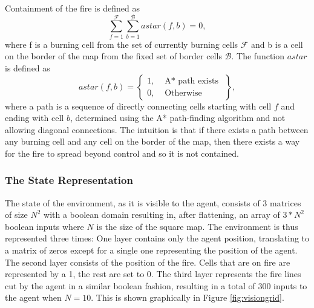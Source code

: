 Containment of the fire is defined as
\begin{equation}\label{eq:containment}
    \sum_{f=1}^\mathcal{F} \sum_{b=1}^\mathcal{B} astar(f, b) = 0,
\end{equation}
where f is a burning cell from the set of currently burning cells $\mathcal{F}$ and b is a cell on the border of the map from the fixed set of border cells $\mathcal{B}$. The function $astar$ is defined as
\begin{equation}\label{eq:astar}
    astar(f, b) = \left\{
        \begin{array}{lr}
            1, & \text{ A* path exists }\\
            0, & \text{ Otherwise }
        \end{array}\right\},
\end{equation}
where a path is a sequence of directly connecting cells starting with cell $f$ and ending with cell $b$, determined using the A* path-finding algorithm and not allowing diagonal connections. The intuition is that if there exists a path between any burning cell and any cell on the border of the map, then there exists a way for the fire to spread beyond control and so it is not contained.


\subsubsection{The State Representation}\label{sec:state_rep}
The state of the environment, as it is visible to the agent, consists of 3 matrices of size $N^2$ with a boolean domain resulting in, after flattening, an array of $3 * N^2$ boolean inputs where $N$ is the size of the square map. The environment is thus represented three times: One layer contains only the agent position, translating to a matrix of zeros except for a single one representing the position of the agent. The second layer consists of the position of the fire. Cells that are on fire are represented by a 1, the rest are set to 0. The third layer represents the fire lines cut by the agent in a similar boolean fashion, resulting in a total of 300 inputs to the agent when $N=10$. This is shown graphically in Figure \ref{fig:visiongrid}.

